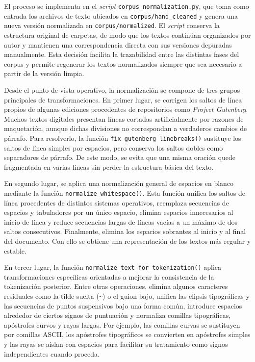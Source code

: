 \documentclass[IB]{TFUOC}%
\begin{document}
El proceso se implementa en el \textit{script} \texttt{corpus\_normalization.py}, que toma como entrada los archivos de texto ubicados en \texttt{corpus/hand\_cleaned} y genera una nueva versión normalizada en \texttt{corpus/normalized}. El \textit{script} conserva la estructura original de carpetas, de modo que los textos continúan organizados por autor y mantienen una correspondencia directa con sus versiones depuradas manualmente. Esta decisión facilita la trazabilidad entre las distintas fases del corpus y permite regenerar los textos normalizados siempre que sea necesario a partir de la versión limpia.

Desde el punto de vista operativo, la normalización se compone de tres grupos principales de transformaciones. En primer lugar, se corrigen los saltos de línea propios de algunas ediciones procedentes de repositorios como \textit{Project Gutenberg}. Muchos textos digitales presentan líneas cortadas artificialmente por razones de maquetación, aunque dichas divisiones no correspondan a verdaderos cambios de párrafo. Para resolverlo, la función \texttt{fix\_gutenberg\_linebreaks()} sustituye los saltos de línea simples por espacios, pero conserva los saltos dobles como separadores de párrafo. De este modo, se evita que una misma oración quede fragmentada en varias líneas sin perder la estructura básica del texto.

En segundo lugar, se aplica una normalización general de espacios en blanco mediante la función \texttt{normalize\_whitespace()}. Esta función unifica los saltos de línea procedentes de distintos sistemas operativos, reemplaza secuencias de espacios y tabuladores por un único espacio, elimina espacios innecesarios al inicio de línea y reduce secuencias largas de líneas vacías a un máximo de dos saltos consecutivos. Finalmente, elimina los espacios sobrantes al inicio y al final del documento. Con ello se obtiene una representación de los textos más regular y estable.

En tercer lugar, la función \texttt{normalize\_text\_for\_tokenization()} aplica transformaciones específicas orientadas a mejorar la consistencia de la tokenización posterior. Entre otras operaciones, elimina algunos caracteres residuales como la tilde suelta (\texttt{\textasciitilde}) o el guion bajo, unifica las elipsis tipográficas y las secuencias de puntos suspensivos bajo una forma común, introduce espacios alrededor de ciertos signos de puntuación y normaliza comillas tipográficas, apóstrofes curvos y rayas largas. Por ejemplo, las comillas curvas se sustituyen por comillas ASCII, los apóstrofes tipográficos se convierten en apóstrofes simples y las rayas se aíslan con espacios para facilitar su tratamiento como signos independientes cuando proceda.
\end{document}

